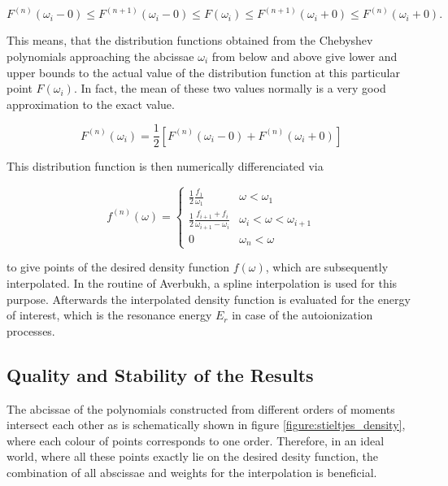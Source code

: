 \begin{equation} \label{equation:Chebyshev_inequalities}
  F^{(n)}(\omega_i - 0) \le F^{(n+1)}(\omega_i - 0) \le F(\omega_i)
  \le F^{(n+1)}(\omega_i + 0) \le F^{(n)}(\omega_i + 0).
\end{equation}

This means, that the distribution functions obtained from the Chebyshev
polynomials approaching the abcissae $\omega_i$ from below and above
give lower and upper bounds to the actual value of the distribution
function at this particular point $F(\omega_i)$. In fact, the mean of these
two values normally is a very good approximation to the exact value.

\begin{equation}
  F^{(n)} (\omega_i) = \frac 12 \left[ F^{(n)} (\omega_i - 0)
                       + F^{(n)} (\omega_i+0) \right]
\end{equation}

This distribution function is then numerically differenciated via

\begin{equation}
  f^{(n)} (\omega) =
  \begin{cases}
    \frac 12 \frac{f_1}{\omega_1}    & \omega < \omega_1\\
    \frac 12 \frac{f_{i+1} + f_i}{\omega_{i+1} - \omega_i}
                                     & \omega_i < \omega < \omega_{i+1}\\
    0                                & \omega_n < \omega
  \end{cases}
\end{equation}

to give points of the desired density function $f(\omega)$, which are
subsequently interpolated. In the routine of Averbukh, a spline interpolation
is used for this purpose. Afterwards the interpolated density function is evaluated
for the energy of interest, which is the resonance energy $E_r$ in case of the
autoionization processes.

\subsection{Quality and Stability of the Results}
The abcissae of the polynomials constructed from different orders
of moments intersect each other as is schematically shown in
figure \ref{figure:stieltjes_density}, where each colour of points corresponds
to one order. Therefore, in an ideal world, where all these points exactly lie
on the desired desity function, the combination of all abscissae
and weights for the interpolation is beneficial.

